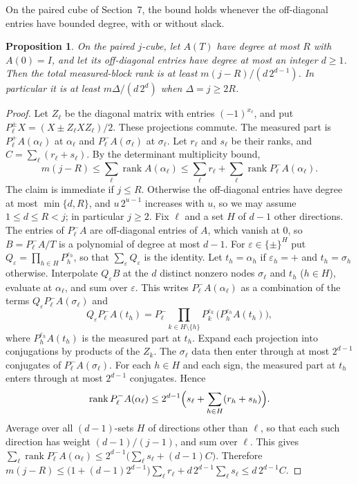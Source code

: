 \documentclass[11pt]{article}
\newtheorem{proposition}[theorem]{Proposition}
\newcommand{\rank}{\operatorname{rank}}
\begin{document}
On the paired cube of Section~7, the bound holds whenever the off-diagonal entries have bounded degree, with or without slack.
\begin{proposition}\label{prop:slackcube}
On the paired $j$-cube, let $A(T)$ have degree at most $R$ with $A(0)=I$, and let its off-diagonal entries have degree at most an integer $d\ge1$. Then the total measured-block rank is at least $m(j-R)/(d\,2^{d-1})$. In particular it is at least $m\Delta/(d\,2^{d})$ when $\Delta=j\ge2R$.
\end{proposition}
\begin{proof}
Let $Z_\ell$ be the diagonal matrix with entries $(-1)^{x_\ell}$, and put $P^\pm_\ell X=(X\pm Z_\ell XZ_\ell)/2$. These projections commute. The measured part is $P^+_\ell A(\alpha_\ell)$ at $\alpha_\ell$ and $P^-_\ell A(\sigma_\ell)$ at $\sigma_\ell$. Let $r_\ell$ and $s_\ell$ be their ranks, and $C=\sum_\ell(r_\ell+s_\ell)$. By the determinant multiplicity bound,
\[m(j-R)\le\sum_\ell\rank A(\alpha_\ell)\le\sum_\ell r_\ell+\sum_\ell\rank P^-_\ell A(\alpha_\ell).\]
The claim is immediate if $j\le R$. Otherwise the off-diagonal entries have degree at most $\min\{d,R\}$, and $u\,2^{u-1}$ increases with $u$, so we may assume $1\le d\le R<j$; in particular $j\ge2$. Fix $\ell$ and a set $H$ of $d-1$ other directions. The entries of $P^-_\ell A$ are off-diagonal entries of $A$, which vanish at $0$, so $B=P^-_\ell A/T$ is a polynomial of degree at most $d-1$. For $\varepsilon\in\{\pm\}^H$ put $Q_\varepsilon=\prod_{h\in H}P^{\varepsilon_h}_h$, so that $\sum_\varepsilon Q_\varepsilon$ is the identity. Let $t_h=\alpha_h$ if $\varepsilon_h=+$ and $t_h=\sigma_h$ otherwise. Interpolate $Q_\varepsilon B$ at the $d$ distinct nonzero nodes $\sigma_\ell$ and $t_h$ ($h\in H$), evaluate at $\alpha_\ell$, and sum over $\varepsilon$. This writes $P^-_\ell A(\alpha_\ell)$ as a combination of the terms $Q_\varepsilon P^-_\ell A(\sigma_\ell)$ and
\[Q_\varepsilon P^-_\ell A(t_h)=P^-_\ell\textstyle\prod_{k\in H\setminus\{h\}}P^{\varepsilon_k}_k\,\bigl(P^{\varepsilon_h}_hA(t_h)\bigr),\]
where $P^{\varepsilon_h}_hA(t_h)$ is the measured part at $t_h$. Expand each projection into conjugations by products of the $Z_k$. The $\sigma_\ell$ data then enter through at most $2^{d-1}$ conjugates of $P^-_\ell A(\sigma_\ell)$. For each $h\in H$ and each sign, the measured part at $t_h$ enters through at most $2^{d-1}$ conjugates. Hence
\[\rank P^-_\ell A(\alpha_\ell)\le2^{d-1}\Bigl(s_\ell+\sum_{h\in H}(r_h+s_h)\Bigr).\]
Average over all $(d-1)$-sets $H$ of directions other than $\ell$, so that each such direction has weight $(d-1)/(j-1)$, and sum over $\ell$. This gives $\sum_\ell\rank P^-_\ell A(\alpha_\ell)\le2^{d-1}\bigl(\sum_\ell s_\ell+(d-1)C\bigr)$. Therefore $m(j-R)\le\bigl(1+(d-1)2^{d-1}\bigr)\sum_\ell r_\ell+d\,2^{d-1}\sum_\ell s_\ell\le d\,2^{d-1}C$.
\end{proof}
\end{document}

